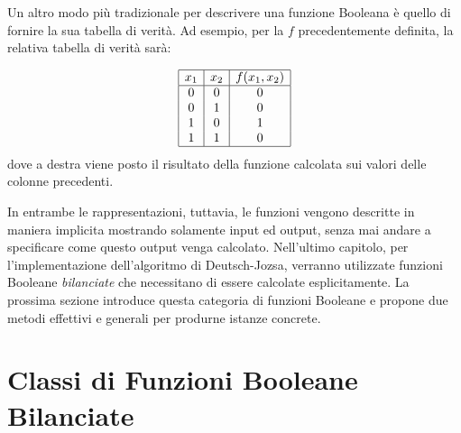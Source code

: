 \documentclass[12pt,a4paper,openright]{report}
\begin{document}
Un altro modo più tradizionale per descrivere una funzione Booleana è quello di fornire la sua tabella di verità.
Ad esempio, per la $f$ precedentemente definita, la relativa tabella di verità sarà:


\begin{displaymath}
    \begin{array}{|c|c|c|}\hline
        x_1 & x_2 & f(x_1, x_2) \\\hline 
        0   & 0   &  0  \\ 
        0   & 1   &  0  \\
        1   & 0   &  1  \\
        1   & 1   &  0  \\\hline
    \end{array}
\end{displaymath}
dove a destra viene posto il risultato della funzione calcolata sui valori delle colonne precedenti.\par
In entrambe le rappresentazioni, tuttavia, le funzioni vengono descritte in maniera implicita mostrando solamente input ed output,
senza mai andare a specificare come questo output venga calcolato. Nell'ultimo capitolo, per l'implementazione dell'algoritmo di Deutsch-Jozsa, verranno utilizzate funzioni Booleane \textit{bilanciate}
che necessitano di essere calcolate esplicitamente. La prossima sezione introduce questa categoria di funzioni Booleane e 
propone due metodi effettivi e generali per produrne istanze concrete.

\section{Classi di Funzioni Booleane Bilanciate}
\end{document}
